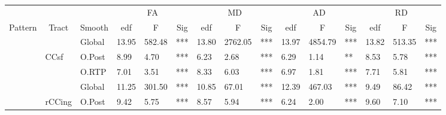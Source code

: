 
\begin{tabular}{llllll|lll|lll|lll}
 &  &  & \multicolumn{3}{c|}{FA} & \multicolumn{3}{c|}{MD} & \multicolumn{3}{c|}{AD} & \multicolumn{3}{c}{RD} \\ \cline{4-15}
\multicolumn{1}{c}{Pattern} & \multicolumn{1}{c}{Tract} & \multicolumn{1}{c}{Smooth} & \multicolumn{1}{c}{edf} & \multicolumn{1}{c}{F} & \multicolumn{1}{c|}{Sig} & \multicolumn{1}{c}{edf} & \multicolumn{1}{c}{F} & \multicolumn{1}{c|}{Sig} & \multicolumn{1}{c}{edf} & \multicolumn{1}{c}{F} & \multicolumn{1}{c|}{Sig} & \multicolumn{1}{c}{edf} & \multicolumn{1}{c}{F} & \multicolumn{1}{c}{Sig} \\ \hline
 &  & \multicolumn{1}{l|}{Global} & 13.95 & 582.48 & *** & 13.80 & 2762.05 & *** & 13.97 & 4854.79 & *** & 13.82 & 513.35 & *** \\
 & CCsf & \multicolumn{1}{l|}{\cellcolor[HTML]{C0C0C0}O.Post} & \cellcolor[HTML]{C0C0C0}8.99 & \cellcolor[HTML]{C0C0C0}4.70 & \cellcolor[HTML]{C0C0C0}*** & \cellcolor[HTML]{C0C0C0}6.23 & \cellcolor[HTML]{C0C0C0}2.68 & \cellcolor[HTML]{C0C0C0}*** & \cellcolor[HTML]{C0C0C0}6.29 & \cellcolor[HTML]{C0C0C0}1.14 & \cellcolor[HTML]{C0C0C0}** & \cellcolor[HTML]{C0C0C0}8.53 & \cellcolor[HTML]{C0C0C0}5.78 & \cellcolor[HTML]{C0C0C0}*** \\
 &  & \multicolumn{1}{l|}{O.RTP} & 7.01 & 3.51 & *** & 8.33 & 6.03 & *** & 6.97 & 1.81 & *** & 7.71 & 5.81 & *** \\
 & \cellcolor[HTML]{EFEFEF} & \multicolumn{1}{l|}{\cellcolor[HTML]{EFEFEF}Global} & \cellcolor[HTML]{EFEFEF}11.25 & \cellcolor[HTML]{EFEFEF}301.50 & \cellcolor[HTML]{EFEFEF}*** & \cellcolor[HTML]{EFEFEF}10.85 & \cellcolor[HTML]{EFEFEF}67.01 & \cellcolor[HTML]{EFEFEF}*** & \cellcolor[HTML]{EFEFEF}12.39 & \cellcolor[HTML]{EFEFEF}467.03 & \cellcolor[HTML]{EFEFEF}*** & \cellcolor[HTML]{EFEFEF}9.49 & \cellcolor[HTML]{EFEFEF}86.42 & \cellcolor[HTML]{EFEFEF}*** \\
 & \cellcolor[HTML]{EFEFEF}rCCing & \multicolumn{1}{l|}{\cellcolor[HTML]{C0C0C0}O.Post} & \cellcolor[HTML]{C0C0C0}9.42 & \cellcolor[HTML]{C0C0C0}5.75 & \cellcolor[HTML]{C0C0C0}*** & \cellcolor[HTML]{C0C0C0}8.57 & \cellcolor[HTML]{C0C0C0}5.94 & \cellcolor[HTML]{C0C0C0}*** & \cellcolor[HTML]{C0C0C0}6.24 & \cellcolor[HTML]{C0C0C0}2.00 & \cellcolor[HTML]{C0C0C0}*** & \cellcolor[HTML]{C0C0C0}9.60 & \cellcolor[HTML]{C0C0C0}7.10 & \cellcolor[HTML]{C0C0C0}*** \\

\end{tabular}
